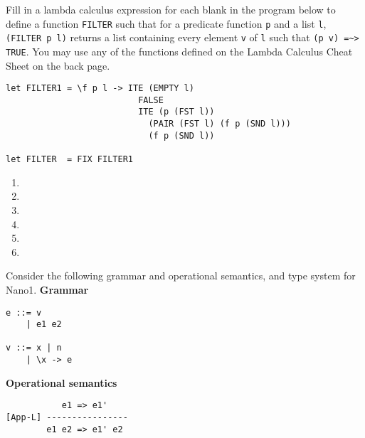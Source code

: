 \documentclass[paper=letter, fontsize=13pt]{article} %
\numberwithin{equation}{section} %
\newif\ifshowanswers\showanswerstrue
\begin{document}
\begin{enumerate}
Fill in a lambda calculus expression for each blank in the program
below to define a function \texttt{FILTER} such that for a predicate function \texttt{p} and a list \texttt{l},
\texttt{(FILTER p l)} returns a list containing every element \texttt{v} of \texttt{l} such that \verb|(p v) =~> TRUE|.
You may use any of the functions defined on the Lambda Calculus Cheat Sheet on the back page. 

\ifshowanswers
\begin{verbatim}
let FILTER1 = \f p l -> ITE (EMPTY l)
                          FALSE
                          ITE (p (FST l))
                            (PAIR (FST l) (f p (SND l)))
                            (f p (SND l))
                      
let FILTER  = FIX FILTER1
\end{verbatim}
\else
\begin{verbatim}
let FILTER1 = \f p l -> ITE _____(A)_______
                            _____(B)_______
                           (ITE _____(C)_______
                                _____(D)_______
                                _____(E)_______)
                               
let FILTER  = ______(F)_______
\end{verbatim}
\fi

\begin{enumerate}[label=(\Alph*)]
   \item \bigskip \bigskip
   \item \bigskip \bigskip
   \item \bigskip \bigskip
   \item \bigskip \bigskip
   \item \bigskip \bigskip
   \item \bigskip \bigskip
\end{enumerate}

\newpage
{}

Consider the following grammar and operational semantics, and type system for Nano1.
{\Large \textbf{Grammar}}
\begin{lstlisting}
e ::= v 
    | e1 e2

v ::= x | n  
    | \x -> e       
\end{lstlisting}

{\Large \textbf{Operational semantics}}
\begin{verbatim}
           e1 => e1'
[App-L] ----------------
        e1 e2 => e1' e2
        

\end{verbatim}
\end{enumerate}
\end{document}

